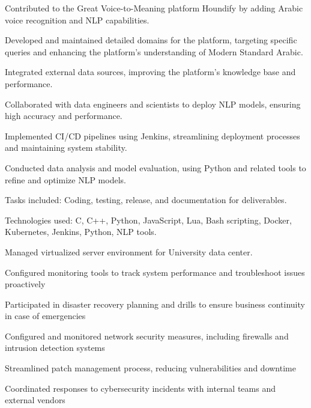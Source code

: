 \begin{resume_list}
    \item Contributed to the Great Voice-to-Meaning platform Houndify by adding Arabic voice recognition and NLP capabilities.
    \item Developed and maintained detailed domains for the platform, targeting specific queries and enhancing the platform’s understanding of Modern Standard Arabic.
    \item Integrated external data sources, improving the platform’s knowledge base and performance.
    \item Collaborated with data engineers and scientists to deploy NLP models, ensuring high accuracy and performance.
    \item Implemented CI/CD pipelines using Jenkins, streamlining deployment processes and maintaining system stability.
    \item Conducted data analysis and model evaluation, using Python and related tools to refine and optimize NLP models.
    \item Tasks included: Coding, testing, release, and documentation for deliverables.
    \item Technologies used: C, C++, Python, JavaScript, Lua, Bash scripting, Docker, Kubernetes, Jenkins, Python, NLP tools.
\end{resume_list}

\begin{resume_list}
    \item Managed virtualized server environment for University data center.
    \item Configured monitoring tools to track system performance and troubleshoot issues proactively
    \item Participated in disaster recovery planning and drills to ensure business continuity in case of emergencies
    \item Configured and monitored network security measures, including firewalls and intrusion detection systems
    \item Streamlined patch management process, reducing vulnerabilities and downtime
    \item Coordinated responses to cybersecurity incidents with internal teams and external vendors
\end{resume_list}

